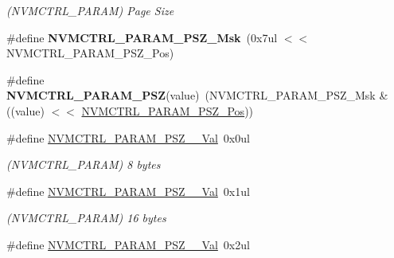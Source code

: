 \begin{DoxyCompactItemize}
\begin{DoxyCompactList}\small\item\em (N\+V\+M\+C\+T\+R\+L\+\_\+\+P\+A\+R\+A\+M) Page Size \end{DoxyCompactList}\item 
\hypertarget{group___s_a_m_l21___n_v_m_c_t_r_l_gacd9411e012f3e690b4e835de166dde28}{}\#define {\bfseries N\+V\+M\+C\+T\+R\+L\+\_\+\+P\+A\+R\+A\+M\+\_\+\+P\+S\+Z\+\_\+\+Msk}~(0x7ul $<$$<$ N\+V\+M\+C\+T\+R\+L\+\_\+\+P\+A\+R\+A\+M\+\_\+\+P\+S\+Z\+\_\+\+Pos)\label{group___s_a_m_l21___n_v_m_c_t_r_l_gacd9411e012f3e690b4e835de166dde28}

\item 
\hypertarget{group___s_a_m_l21___n_v_m_c_t_r_l_ga58491f9494d89b466f85269fcdb1f26e}{}\#define {\bfseries N\+V\+M\+C\+T\+R\+L\+\_\+\+P\+A\+R\+A\+M\+\_\+\+P\+S\+Z}(value)~(N\+V\+M\+C\+T\+R\+L\+\_\+\+P\+A\+R\+A\+M\+\_\+\+P\+S\+Z\+\_\+\+Msk \& ((value) $<$$<$ \hyperlink{group___s_a_m_l21___n_v_m_c_t_r_l_gabec5624158a60a0f0d0b8a62afe18af8}{N\+V\+M\+C\+T\+R\+L\+\_\+\+P\+A\+R\+A\+M\+\_\+\+P\+S\+Z\+\_\+\+Pos}))\label{group___s_a_m_l21___n_v_m_c_t_r_l_ga58491f9494d89b466f85269fcdb1f26e}

\item 
\hypertarget{group___s_a_m_l21___n_v_m_c_t_r_l_ga9a83c6574dc48ac1c69701673922d2f3}{}\#define \hyperlink{group___s_a_m_l21___n_v_m_c_t_r_l_ga9a83c6574dc48ac1c69701673922d2f3}{N\+V\+M\+C\+T\+R\+L\+\_\+\+P\+A\+R\+A\+M\+\_\+\+P\+S\+Z\+\_\+\_\+\+Val}~0x0ul\label{group___s_a_m_l21___n_v_m_c_t_r_l_ga9a83c6574dc48ac1c69701673922d2f3}

\begin{DoxyCompactList}\small\item\em (N\+V\+M\+C\+T\+R\+L\+\_\+\+P\+A\+R\+A\+M) 8 bytes \end{DoxyCompactList}\item 
\hypertarget{group___s_a_m_l21___n_v_m_c_t_r_l_ga10b4a62c2bab14a45967ee663cfbdd10}{}\#define \hyperlink{group___s_a_m_l21___n_v_m_c_t_r_l_ga10b4a62c2bab14a45967ee663cfbdd10}{N\+V\+M\+C\+T\+R\+L\+\_\+\+P\+A\+R\+A\+M\+\_\+\+P\+S\+Z\+\_\+\_\+\+Val}~0x1ul\label{group___s_a_m_l21___n_v_m_c_t_r_l_ga10b4a62c2bab14a45967ee663cfbdd10}

\begin{DoxyCompactList}\small\item\em (N\+V\+M\+C\+T\+R\+L\+\_\+\+P\+A\+R\+A\+M) 16 bytes \end{DoxyCompactList}\item 
\hypertarget{group___s_a_m_l21___n_v_m_c_t_r_l_gae80b28e70177db78d7d5a0d748809192}{}\#define \hyperlink{group___s_a_m_l21___n_v_m_c_t_r_l_gae80b28e70177db78d7d5a0d748809192}{N\+V\+M\+C\+T\+R\+L\+\_\+\+P\+A\+R\+A\+M\+\_\+\+P\+S\+Z\+\_\+\_\+\+Val}~0x2ul\label{group___s_a_m_l21___n_v_m_c_t_r_l_gae80b28e70177db78d7d5a0d748809192}


\end{DoxyCompactItemize}

